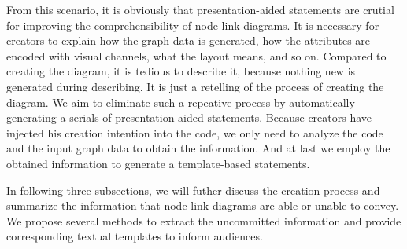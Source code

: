 From this scenario, it is obviously that presentation-aided statements are crutial for improving the comprehensibility of node-link diagrams.
It is necessary for creators to explain how the graph data is generated, how the attributes are encoded with visual channels, what the layout means, and so on.
Compared to creating the diagram, it is tedious to describe it, because nothing new is generated during describing.
It is just a retelling of the process of creating the diagram.
We aim to eliminate such a repeative process by automatically generating a serials of presentation-aided statements.
Because creators have injected his creation intention into the code, we only need to analyze the code and the input graph data to obtain the information. And at last we employ the obtained information to generate a template-based statements.

In following three subsections, we will futher discuss the creation process and summarize the information that node-link diagrams are able or unable to convey.
We propose several methods to extract the uncommitted information and provide corresponding textual templates to inform audiences.



